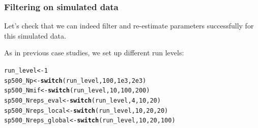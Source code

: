 \documentclass{beamer}\usepackage[]{graphicx}\usepackage[]{color}
\makeatletter
\newcommand{\hlnum}[1]{\textcolor[rgb]{0.686,0.059,0.569}{#1}}%
\newcommand{\hlstd}[1]{\textcolor[rgb]{0.345,0.345,0.345}{#1}}%
\newcommand{\hlkwb}[1]{\textcolor[rgb]{0.69,0.353,0.396}{#1}}%
\newcommand{\hlkwd}[1]{\textcolor[rgb]{0.737,0.353,0.396}{\textbf{#1}}}%
\newenvironment{kframe}{%
 \def\at@end@of@kframe{}%
 \ifinner\ifhmode%
  \def\at@end@of@kframe{\end{minipage}}%
  \begin{minipage}{\columnwidth}%
 \fi\fi%
 \def\FrameCommand##1{\hskip\@totalleftmargin \hskip-\fboxsep
 \colorbox{shadecolor}{##1}\hskip-\fboxsep
     \hskip-\linewidth \hskip-\@totalleftmargin \hskip\columnwidth}%
 \MakeFramed {\advance\hsize-\width
   \@totalleftmargin\z@ \linewidth\hsize
   \@setminipage}}%
 {\par\unskip\endMakeFramed%
 \at@end@of@kframe}
\newenvironment{knitrout}{}{} %
\makeatother
\begin{document}
\begin{frame}[fragile]

\frametitle{Filtering on simulated data}

\bi

\item Let's check that we can indeed filter and re-estimate parameters successfully for this simulated data.  

\item As in previous case studies, we set up different run levels:

\ei

\begin{knitrout}\small
{}\color{fgcolor}\begin{kframe}
\begin{alltt}
\hlstd{run_level} \hlkwb{<-} \hlnum{1}
\hlstd{sp500_Np} \hlkwb{<-}           \hlkwd{switch}\hlstd{(run_level,}\hlnum{100}\hlstd{,}\hlnum{1e3}\hlstd{,}\hlnum{2e3}\hlstd{)}
\hlstd{sp500_Nmif} \hlkwb{<-}         \hlkwd{switch}\hlstd{(run_level,}\hlnum{10}\hlstd{,} \hlnum{100}\hlstd{,}\hlnum{200}\hlstd{)}
\hlstd{sp500_Nreps_eval} \hlkwb{<-}   \hlkwd{switch}\hlstd{(run_level,}\hlnum{4}\hlstd{,}  \hlnum{10}\hlstd{,}  \hlnum{20}\hlstd{)}
\hlstd{sp500_Nreps_local} \hlkwb{<-}  \hlkwd{switch}\hlstd{(run_level,}\hlnum{10}\hlstd{,} \hlnum{20}\hlstd{,} \hlnum{20}\hlstd{)}
\hlstd{sp500_Nreps_global} \hlkwb{<-} \hlkwd{switch}\hlstd{(run_level,}\hlnum{10}\hlstd{,} \hlnum{20}\hlstd{,} \hlnum{100}\hlstd{)}
\end{alltt}
\end{kframe}
\end{knitrout}

\end{frame}
\end{document}
